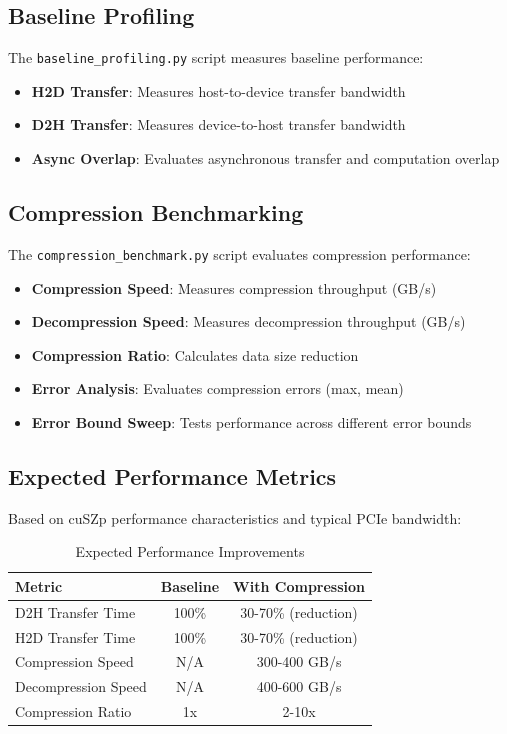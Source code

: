 \documentclass{polyu-comp}
\begin{document}
\subsection{Baseline Profiling}

The \texttt{baseline\_profiling.py} script measures baseline performance:

\begin{itemize}
    \item \textbf{H2D Transfer}: Measures host-to-device transfer bandwidth
    \item \textbf{D2H Transfer}: Measures device-to-host transfer bandwidth
    \item \textbf{Async Overlap}: Evaluates asynchronous transfer and computation overlap
\end{itemize}

\subsection{Compression Benchmarking}

The \texttt{compression\_benchmark.py} script evaluates compression performance:

\begin{itemize}
    \item \textbf{Compression Speed}: Measures compression throughput (GB/s)
    \item \textbf{Decompression Speed}: Measures decompression throughput (GB/s)
    \item \textbf{Compression Ratio}: Calculates data size reduction
    \item \textbf{Error Analysis}: Evaluates compression errors (max, mean)
    \item \textbf{Error Bound Sweep}: Tests performance across different error bounds
\end{itemize}

\subsection{Expected Performance Metrics}

Based on cuSZp performance characteristics and typical PCIe bandwidth:

\begin{table}[H]
\centering
\caption{Expected Performance Improvements}
\begin{tabular}{lcc}
\toprule
Metric & Baseline & With Compression \\
\midrule
D2H Transfer Time & 100\% & 30-70\% (reduction) \\
H2D Transfer Time & 100\% & 30-70\% (reduction) \\
Compression Speed & N/A & 300-400 GB/s \\
Decompression Speed & N/A & 400-600 GB/s \\
Compression Ratio & 1x & 2-10x \\
\bottomrule
\end{tabular}
\end{table}
\end{document}
